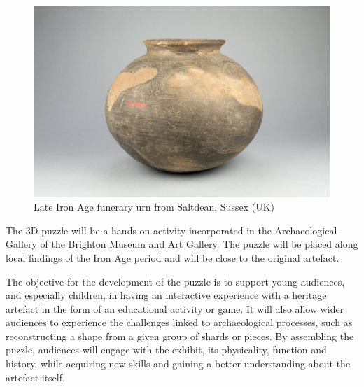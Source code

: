 \documentclass[acmlarge,screen]{acmart}
\begin{document}
\begin{figure}[htb]
  \centering
  \includegraphics[width=0.6\linewidth]{images/pot}
  \caption{\label{fig:pot}
    Late Iron Age funerary urn from Saltdean, Sussex (UK)}
\end{figure}

The 3D puzzle will be a hands-on activity incorporated in the Archaeological Gallery of the Brighton Museum and Art Gallery. The puzzle will be placed along local findings of the Iron Age period and will be close to the original artefact.

The objective for the development of the puzzle is to support young audiences, and especially children, in having an interactive experience with a heritage artefact in the form of an educational activity or game. It will also allow wider audiences to experience the challenges linked to archaeological processes, such as reconstructing a shape from a given group of shards or pieces. By assembling the puzzle, audiences will engage with the exhibit, its physicality, function and history, while acquiring new skills and gaining a better understanding about the artefact itself.
\end{document}
